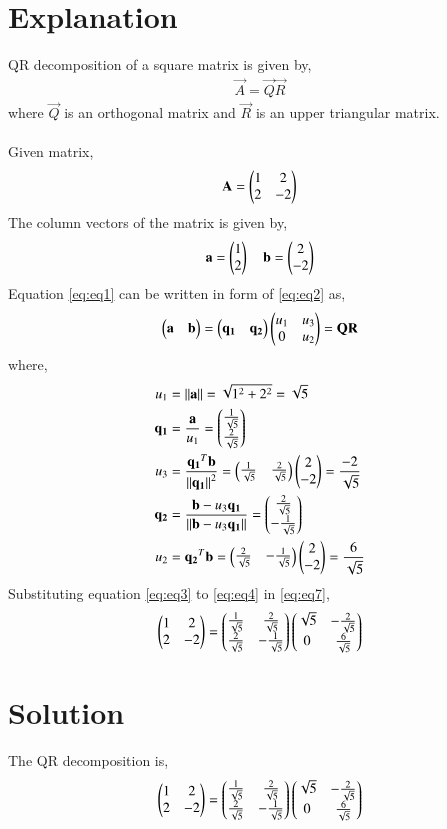 \documentclass[journal,12pt,twocolumn]{IEEEtran}
\begin{document}
\section{Explanation}
QR decomposition of a square matrix is given by,
\begin{align}
    \vec{A} = \vec{Q}\vec{R}
\end{align}
where $\vec{Q}$ is an orthogonal matrix and $\vec{R}$ is an upper triangular matrix.\\
\\
Given matrix,
\begin{align}
    \mathbf{A} = \begin{pmatrix}1&2\\2&-2\end{pmatrix} \label{eq:eq1}
\end{align}
The column vectors of the matrix is given by,
\begin{align}
    \mathbf{a}=\begin{pmatrix}1\\2\end{pmatrix} \quad \mathbf{b}=\begin{pmatrix}2\\-2\end{pmatrix} \label{eq:eq2}
\end{align}
Equation \eqref{eq:eq1} can be written in form of \eqref{eq:eq2} as,
\begin{align}
    \begin{pmatrix}\mathbf{a}&\mathbf{b}\end{pmatrix} = \begin{pmatrix}\mathbf{q_1}&\mathbf{q_2}\end{pmatrix} \begin{pmatrix}u_1&u_3\\0&u_2\end{pmatrix} = \mathbf{Q}\mathbf{R} \label{eq:eq7}
\end{align}
where, 
\begin{align}
u_1 &= \left\lVert\mathbf{a}\right\rVert = \sqrt{1^2+2^2} = \sqrt{5}\label{eq:eq3}\\
\mathbf{q_1} &= \frac{\mathbf{a}}{u_1} = \begin{pmatrix}\frac{1}{\sqrt{5}}\\ \frac{2}{\sqrt{5}}\end{pmatrix}\\
u_3 &= \frac{\mathbf{q_1}^T\mathbf{b}}{\left\lVert\mathbf{q_1}\right\rVert^2} = \begin{pmatrix}\frac{1}{\sqrt{5}}& \frac{2}{\sqrt{5}}\end{pmatrix}\begin{pmatrix}2\\-2\end{pmatrix} = \frac{-2}{\sqrt{5}}\\
\mathbf{q_2} &= \frac{\mathbf{b} - u_3 \mathbf{q_1}}{\left\lVert\mathbf{b} - u_3 \mathbf{q_1}\right\rVert} = \begin{pmatrix}\frac{2}{\sqrt{5}}\\ -\frac{1}{\sqrt{5}}\end{pmatrix}\\
u_2 &= {\mathbf{q_2}^T\mathbf{b}} = \begin{pmatrix}\frac{2}{\sqrt{5}}&-\frac{1}{\sqrt{5}}\end{pmatrix}\begin{pmatrix}2\\-2\end{pmatrix}=\frac{6}{\sqrt{5}}\label{eq:eq4}
\end{align}
Substituting equation \eqref{eq:eq3} to \eqref{eq:eq4} in \eqref{eq:eq7},
\begin{align}
    \begin{pmatrix}1&2\\2&-2\end{pmatrix} = \begin{pmatrix}\frac{1}{\sqrt{5}}&\frac{2}{\sqrt{5}}\\\frac{2}{\sqrt{5}}&-\frac{1}{\sqrt{5}}\end{pmatrix}\begin{pmatrix}\sqrt{5}&-\frac{2}{\sqrt{5}}\\0&\frac{6}{\sqrt{5}}\end{pmatrix}
\end{align}
\section{Solution}
The QR decomposition is,
\begin{align}
    \begin{pmatrix}1&2\\2&-2\end{pmatrix} = \begin{pmatrix}\frac{1}{\sqrt{5}}&\frac{2}{\sqrt{5}}\\\frac{2}{\sqrt{5}}&-\frac{1}{\sqrt{5}}\end{pmatrix}\begin{pmatrix}\sqrt{5}&-\frac{2}{\sqrt{5}}\\0&\frac{6}{\sqrt{5}}\end{pmatrix}
\end{align}
\\
\end{document}
